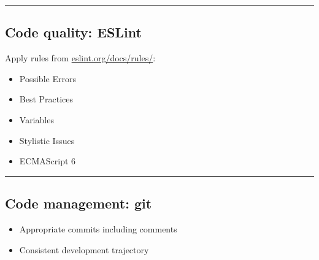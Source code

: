 \documentclass[]{article}
\providecommand{\tightlist}{%
  \setlength{\itemsep}{0pt}\setlength{\parskip}{0pt}}
\begin{document}
\begin{center}\rule{0.5\linewidth}{\linethickness}\end{center}

\hypertarget{code-quality-eslint}{%
\subsection{Code quality: ESLint}\label{code-quality-eslint}}

Apply rules from
\href{https://eslint.org/docs/rules/}{eslint.org/docs/rules/}:

\begin{itemize}
\tightlist
\item
  Possible Errors
\item
  Best Practices
\item
  Variables
\item
  Stylistic Issues
\item
  ECMAScript 6
\end{itemize}

\begin{center}\rule{0.5\linewidth}{\linethickness}\end{center}

\hypertarget{code-management-git}{%
\subsection{Code management: git}\label{code-management-git}}

\begin{itemize}
\tightlist
\item
  Appropriate commits including comments
\item
  Consistent development trajectory
\end{itemize}
\end{document}
